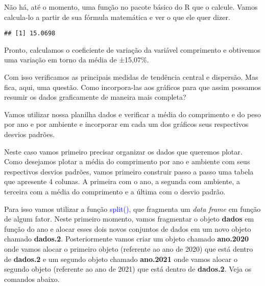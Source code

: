 \documentclass[14pt,titlepage, oneside, openany, a4paper]{book}
\newenvironment{Shaded}{\begin{snugshade}}{\end{snugshade}}
\newcommand{\DataTypeTok}[1]{\textcolor[rgb]{0.13,0.29,0.53}{#1}}
\newcommand{\DecValTok}[1]{\textcolor[rgb]{0.00,0.00,0.81}{#1}}
\newcommand{\FloatTok}[1]{\textcolor[rgb]{0.00,0.00,0.81}{#1}}
\newcommand{\KeywordTok}[1]{\textcolor[rgb]{0.13,0.29,0.53}{\textbf{#1}}}
\newcommand{\NormalTok}[1]{#1}
\newcommand{\OperatorTok}[1]{\textcolor[rgb]{0.81,0.36,0.00}{\textbf{#1}}}
\newcommand{\StringTok}[1]{\textcolor[rgb]{0.31,0.60,0.02}{#1}}
\begin{document}
Não há, até o momento, uma função no pacote básico do R que o calcule. Vamos calcula-lo a partir de sua fórmula matemática e ver o que ele quer dizer.

\begin{Shaded}
\end{Shaded}

\begin{verbatim}
## [1] 15.0698
\end{verbatim}

Pronto, calculamos o coeficiente de variação da variável comprimento e obtivemos uma variação em torno da média de ±15,07\%.

Com isso verificamos as principais medidas de tendência central e dispersão. Mas fica, aqui, uma questão. Como incorpora-las aos gráficos para que assim possamos resumir os dados graficamente de maneira mais completa?

Vamos utilizar nossa planilha dados e verificar a média do comprimento e do peso por ano e por ambiente e incorporar em cada um dos gráficos seus respectivos desvios padrões.

Neste caso vamos primeiro precisar organizar os dados que queremos plotar. Como desejamos plotar a média do comprimento por ano e ambiente com seus respectivos desvios padrões, vamos primeiro construir passo a passo uma tabela que apresente 4 colunas. A primeira com o ano, a segunda com ambiente, a terceira com a média do comprimento e a última com o desvio padrão.

Para isso vamos utilizar a função \textcolor{blue}{split()}, que fragmenta um \emph{data frame} em função de algum fator. Neste primeiro momento, vamos fragmentar o objeto \textbf{dados} em função do ano e alocar esses dois novos conjuntos de dados em um novo objeto chamado \textbf{dados.2}. Posteriormente vamos criar um objeto chamado \textbf{ano.2020} onde vamos alocar o primeiro objeto (referente ao ano de 2020) que está dentro de \textbf{dados.2} e um segundo objeto chamado \textbf{ano.2021} onde vamos alocar o segundo objeto (referente ao ano de 2021) que está dentro de \textbf{dados.2}. Veja os comandos abaixo.

\begin{Shaded}
\end{Shaded}
\end{document}
